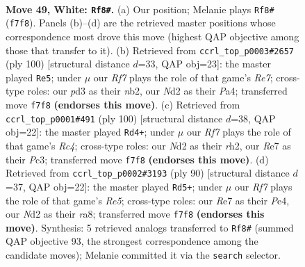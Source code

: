 \documentclass[11pt]{article}
\begin{document}
\clearpage

\begin{figure}[p]\centering
\begin{subfigure}{0.46\textwidth}\centering
\resizebox{\linewidth}{!}{%
\newchessgame
\chessboard[
  setfen={6k1/4RR2/7B/8/1p4P1/pP1p4/P1PN3K/8 w - - 2 49},
  showmover=false,
  pgfstyle=straightmove, color=movearrow, markmove={f7-f8}
]}
\caption{}
\end{subfigure}\hfill
\begin{subfigure}{0.46\textwidth}\centering
\resizebox{\linewidth}{!}{%
\newchessgame
\chessboard[
  setfen={3r4/R3R2p/3k2p1/5p2/P2p1P2/6P1/1n6/6K1 w - - 0 51},
  showmover=false,
  pgfstyle=straightmove, color=movearrow, markmove={e7-e5}
]}
\caption{}
\end{subfigure}
\\[4pt]
\begin{subfigure}{0.46\textwidth}\centering
\resizebox{\linewidth}{!}{%
\newchessgame
\chessboard[
  setfen={8/8/p1p4p/P2k4/1PR5/2P1p1P1/7r/5K2 w - - 2 51},
  showmover=false,
  pgfstyle=straightmove, color=movearrow, markmove={c4-d4}
]}
\caption{}
\end{subfigure}\hfill
\begin{subfigure}{0.46\textwidth}\centering
\resizebox{\linewidth}{!}{%
\newchessgame
\chessboard[
  setfen={r7/5p2/3k2p1/4R2p/4P2P/5PP1/4K3/8 w - - 1 46},
  showmover=false,
  pgfstyle=straightmove, color=movearrow, markmove={e5-d5}
]}
\caption{}
\end{subfigure}
\caption{\textbf{Move 49, White: \texttt{Rf8\#}.} (a) Our position; Melanie plays \texttt{Rf8\#} (\texttt{f7f8}). Panels (b)--(d) are the retrieved master positions whose correspondence most drove this move (highest QAP objective among those that transfer to it). (b) Retrieved from \texttt{ccrl\_top\_p0003\#2657} (ply 100) [structural distance $d$=33, QAP obj=23]: the master played \texttt{Re5}; under $\mu$ our \emph{Rf7} plays the role of that game's \emph{Re7}; cross-type roles: our \emph{p}d3 as their \emph{n}b2, our \emph{N}d2 as their \emph{P}a4; transferred move \texttt{f7f8} \textbf{(endorses this move)}. (c) Retrieved from \texttt{ccrl\_top\_p0001\#491} (ply 100) [structural distance $d$=38, QAP obj=22]: the master played \texttt{Rd4+}; under $\mu$ our \emph{Rf7} plays the role of that game's \emph{Rc4}; cross-type roles: our \emph{N}d2 as their \emph{r}h2, our \emph{R}e7 as their \emph{P}c3; transferred move \texttt{f7f8} \textbf{(endorses this move)}. (d) Retrieved from \texttt{ccrl\_top\_p0002\#3193} (ply 90) [structural distance $d$=37, QAP obj=22]: the master played \texttt{Rd5+}; under $\mu$ our \emph{Rf7} plays the role of that game's \emph{Re5}; cross-type roles: our \emph{R}e7 as their \emph{P}e4, our \emph{N}d2 as their \emph{r}a8; transferred move \texttt{f7f8} \textbf{(endorses this move)}. Synthesis: 5 retrieved analogs transferred to \texttt{Rf8\#} (summed QAP objective 93, the strongest correspondence among the candidate moves); Melanie committed it via the \texttt{search} selector.}
\label{fig:thought-m96}
\end{figure}
\end{document}
